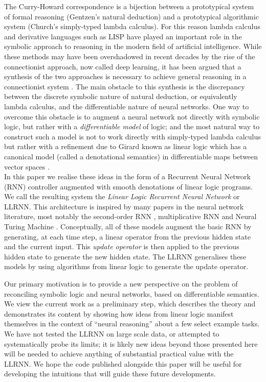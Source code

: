 \documentclass[english,letter paper,12pt,leqno]{article}
\theoremstyle{example}
\numberwithin{equation}{section}
\begin{document}
The Curry-Howard correspondence \cite{sorensen} is a bijection between a prototypical system of formal reasoning (Gentzen's natural deduction) and a prototypical algorithmic system (Church's simply-typed lambda calculus). For this reason lambda calculus and derivative languages such as LISP have played an important role in the symbolic approach to reasoning in the modern field of artificial intelligence. While these methods may have been overshadowed in recent decades by the rise of the connectionist approach, now called deep learning, it has been argued that a synthesis of the two approaches is necessary to achieve general reasoning in a connectionist system \cite{minsky}. The main obstacle to this synthesis is the discrepancy between the discrete symbolic nature of natural deduction, or equivalently lambda calculus, and the differentiable nature of neural networks. One way to overcome this obstacle is to augment a neural network not directly with symbolic logic, but rather with a \emph{differentiable model} of logic; and the most natural way to construct such a model is not to work directly with simply-typed lambda calculus but rather with a refinement due to Girard known as linear logic \cite{girard} which has a canonical model (called a denotational semantics) in differentiable maps between vector spaces \cite{ehrhard-survey,blutecon,murfetclift}. 
\\

In this paper we realise these ideas in the form of a Recurrent Neural Network (RNN) controller \cite{elman} augmented with smooth denotations of linear logic programs. We call the resulting system the \emph{Linear Logic Recurrent Neural Network} or LLRNN. This architecture is inspired by many papers in the neural network literature, most notably the second-order RNN \cite{joulin}, multiplicative RNN \cite{sutskever} and Neural Turing Machine \cite{ntm}. Conceptually, all of these models augment the basic RNN by generating, at each time step, a linear operator from the previous hidden state and the current input. This \emph{update operator} is then applied to the previous hidden state to generate the new hidden state. The LLRNN generalises these models by using algorithms from linear logic to generate the update operator.

Our primary motivation is to provide a new perspective on the problem of reconciling symbolic logic and neural networks, based on differentiable semantics. We view the current work as a preliminary step, which describes the theory and demonstrates its content by showing how ideas from linear logic manifest themselves in the context of ``neural reasoning'' about a few select example tasks. We have not tested the LLRNN on large scale data, or attempted to systematically probe its limits; it is likely new ideas beyond those presented here will be needed to achieve anything of substantial practical value with the LLRNN. We hope the code published alongside this paper will be useful for developing the intuitions that will guide these future developments.
\end{document}
